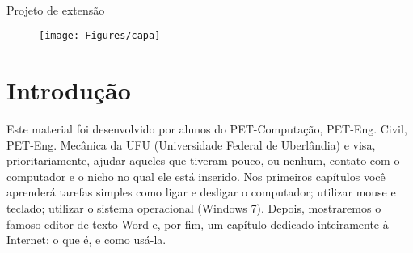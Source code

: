 \documentclass[hidelinks,12pt]{article}
\newcommand{\bigicon}[1]{\texttt{[image: \#1]}}
\newcommand{\iconb}[1]{\texttt{[image: \#1]}}
\begin{document}
\pagestyle{fancy}


\begin{center}
	\\
	\vspace{0.5cm}\large{Projeto de extensão}
\end{center}

\lhead{\bigicon{Figures/ufu}}
\rhead{\bigicon{Figures/facom}}
\lfoot{}
\cfoot{}
\rfoot{}
\vspace{1cm}
\begin{figure}[!h]
	\centering
	\texttt{[image: Figures/capa]}

\end{figure}


\newpage
\fancyhead[C]{}
\fancyhead[R]{\iconb{Figures/comppet}}
\fancyhead[L]{\leftmark}
\fancyfoot{}
\fancyfoot[C]{\hspace{3.0cm}\thepage}


\tableofcontents
\listoffigures

{\let\thefootnote\relax{}}

{\let\thefootnote\relax{}}

{\let\thefootnote\relax{}}

\newpage

\section{Introdução}

 Este material foi desenvolvido por alunos do PET-Computação, PET-Eng. Civil, PET-Eng. Mecânica da UFU (Universidade Federal de Uberlândia) e visa, prioritariamente, ajudar aqueles que tiveram pouco, ou nenhum, contato com o computador e o nicho no qual ele está inserido. Nos primeiros capítulos você aprenderá tarefas simples como ligar e desligar o computador; utilizar mouse e teclado; utilizar o sistema operacional (Windows 7). Depois, mostraremos o famoso editor de texto Word e, por fim, um capítulo dedicado inteiramente à Internet: o que é, e como usá-la.
 
\end{document}
